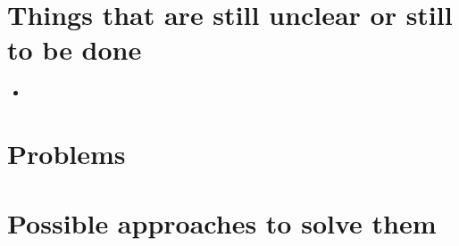 \section{Things that are still unclear or still to be done}
\begin{itemize}
	\item 
\end{itemize}

\section{Problems}

\section{Possible approaches to solve them}


